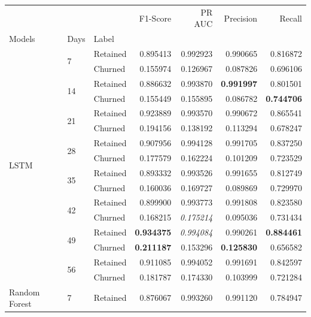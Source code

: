 \documentclass{kththesis}
\begin{document}
\begin{table}
\centering
\begin{tabular}{lllrrrr}
\toprule
     &   &          &  F1-Score &    PR AUC &  Precision &    Recall \\
Models & Days & Label &           &           &            &           \\
\midrule
\multirow{16}{*}{LSTM} & \multirow{2}{*}{7} & Retained &  0.895413 &  0.992923 &   0.990665 &  0.816872 \\
     &   & Churned &  0.155974 &  0.126967 &   0.087826 &  0.696106 \\
\cline{2-7}
     & \multirow{2}{*}{14} & Retained &  0.886632 &  0.993870 &   \textbf{0.991997} &  0.801501 \\
     &   & Churned &  0.155449 &  0.155895 &   0.086782 &  \textbf{0.744706} \\
\cline{2-7}
     & \multirow{2}{*}{21} & Retained &  0.923889 &  0.993570 &   0.990672 &  0.865541 \\
     &   & Churned &  0.194156 &  0.138192 &   0.113294 &  0.678247 \\
\cline{2-7}
     & \multirow{2}{*}{28} & Retained &  0.907956 &  0.994128 &   0.991705 &  0.837250 \\
     &   & Churned &  0.177579 &  0.162224 &   0.101209 &  0.723529 \\
\cline{2-7}
     & \multirow{2}{*}{35} & Retained &  0.893332 &  0.993526 &   0.991655 &  0.812749 \\
     &   & Churned &  0.160036 &  0.169727 &   0.089869 &  0.729970 \\
\cline{2-7}
     & \multirow{2}{*}{42} & Retained &  0.899900 &  0.993773 &  0.991808 &  0.823580 \\
     &   & Churned &  0.168215 &  \textit{0.175214} &   0.095036 &  0.731434 \\
\cline{2-7}
     & \multirow{2}{*}{49} & Retained &  \textbf{0.934375} &  \textit{0.994084} &   0.990261 &  \textbf{0.884461} \\
     &   & Churned &  \textbf{0.211187} &  0.153296 &   \textbf{0.125830} &  0.656582 \\
\cline{2-7}
     & \multirow{2}{*}{56} & Retained &  0.911085 &  0.994052 &   0.991691 &  0.842597 \\
     &   & Churned &  0.181787 &  0.174330 &   0.103999 &  0.721284 \\
\cline{1-7}
\cline{2-7}
\multirow{16}{*}{Random Forest} & \multirow{2}{*}{7} & Retained &  0.876067 &  0.993260 &   0.991120 &  0.784947 \\

\end{tabular}
\end{table}
\end{document}
